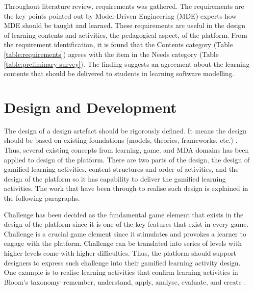 \documentclass[12pt, a4paper]{report} \usepackage[titletoc]{appendix}
\begin{document}
Throughout literature review, requirements was gathered. The requirements are the key points pointed out by Model-Driven Engineering (MDE) experts how MDE should be taught and learned. These requirements are useful in the design of learning contents and activities, the pedagogical aspect, of the platform. From the requirement identification, it is found that the Contents category (Table \ref{table:requirements}) agrees with the item in the Needs category (Table \ref{table:preliminary-survey}). The finding suggests an agreement about the learning contents that should be delivered to students in learning software modelling.

\section{Design and Development}
The design of a design artefact should be rigorously defined. It means the design should be based on existing foundations (models, theories, frameworks, etc.) \cite{von2004design}. Thus, several existing concepts from learning, game, and MDA domains has been applied to design of the platform. There are two parts of the design, the design of gamified learning activities, content structures and order of activities, and the design of the platform so it has capability to deliver the gamified learning activities. The work that have been through to realise such design is explained in the following paragraphs. 

Challenge has been decided as the fundamental game element that exists in the design of the platform since it is one of the key features that exist in every game. Challenge is a crucial game element since it stimulates and provokes a learner to engage with the platform. Challenge can be translated into series of levels with higher levels come with higher difficulties. Thus, the platform should support designers to express such challenge into their gamified learning activity design. One example is to realise learning activities that confirm learning activities in Bloom's taxonomy--remember, understand, apply, analyse, evaluate, and create \cite{krathwohl2002revision}.
\end{document}
